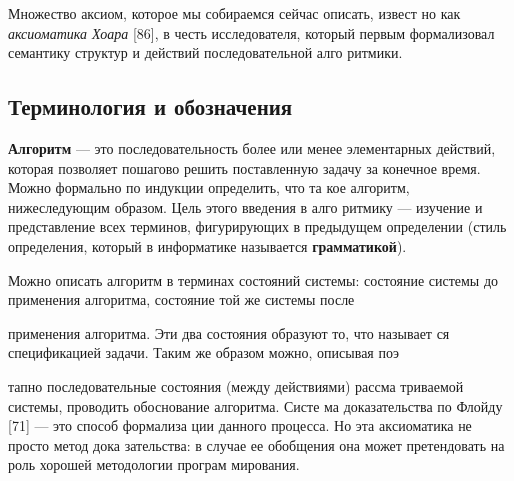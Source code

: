 	Множество аксиом, которое мы собираемся сейчас описать, извест­
	но как \textit{аксиоматика Хоара} [86], в честь исследователя, который первым
	формализовал семантику структур и действий последовательной алго
	ритмики.
	
	\subsection{Терминология и обозначения}
	
	\noindent \textbf{Алгоритм} — это последовательность более или менее элементарных
	действий, которая позволяет пошагово решить поставленную задачу за
	конечное время. Можно формально по индукции определить, что та­
	кое алгоритм, нижеследующим образом. Цель этого введения в алго­
	ритмику — изучение и представление всех терминов, фигурирующих в
	предыдущем определении (стиль определения, который в информатике
	называется \textbf{грамматикой}).
	
	Можно описать алгоритм в терминах состояний системы: состояние
	системы до применения алгоритма, состояние той же системы после
	\pagebreak
	
\noindent применения алгоритма. Эти два состояния образуют то, что называет­
ся спецификацией задачи. Таким же образом можно, описывая поэ­

\noindent тапно последовательные состоя­ния\linebreak
(между действиями) рассма­
триваемой системы, проводить обоснование алгоритма. Систе­
ма доказательства по Флой­ду [71] — это способ формализа­
ции данного процесса. Но эта ак­сиоматика не просто метод дока­
зательства: в случае ее обобще­ния она может претендовать на роль хорошей методологии програм
мирования.
\newline

